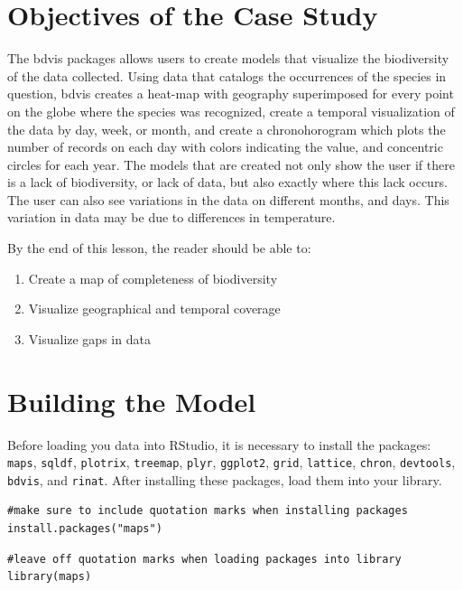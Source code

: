 \section{Objectives of the Case Study}

The bdvis packages allows users to create models that visualize the biodiversity of the data collected.
Using data that catalogs the occurrences of the species in question, bdvis creates a  heat-map with geography superimposed for every point on the globe where the species was recognized, create a temporal visualization of the data by day, week, or month, and create a chronohorogram which plots the number of records on each day with colors indicating the value, and concentric circles for each year.
The models that are created not only show the user if there is a lack of biodiversity, or lack of data, but also exactly where this lack occurs.
The user can also see variations in the data on different months, and days.
This variation in data may be due to differences in temperature.

By the end of this lesson, the reader should be able to:
\begin{enumerate}
\item Create a map of completeness of biodiversity
\item Visualize geographical and temporal coverage
\item Visualize gaps in data
\end{enumerate}

\section{Building the Model}

Before loading you data into RStudio, it is necessary to install the packages: \texttt{maps}, \texttt{sqldf}, \texttt{plotrix}, \texttt{treemap}, \texttt{plyr}, \texttt{ggplot2}, \texttt{grid}, \texttt{lattice}, \texttt{chron}, \texttt{devtools}, \texttt{bdvis}, and \texttt{rinat}.
After installing these packages, load them into your library.

\begin{lstlisting}
#make sure to include quotation marks when installing packages
install.packages("maps")
\end{lstlisting}

\begin{lstlisting}
#leave off quotation marks when loading packages into library
library(maps)
\end{lstlisting}

